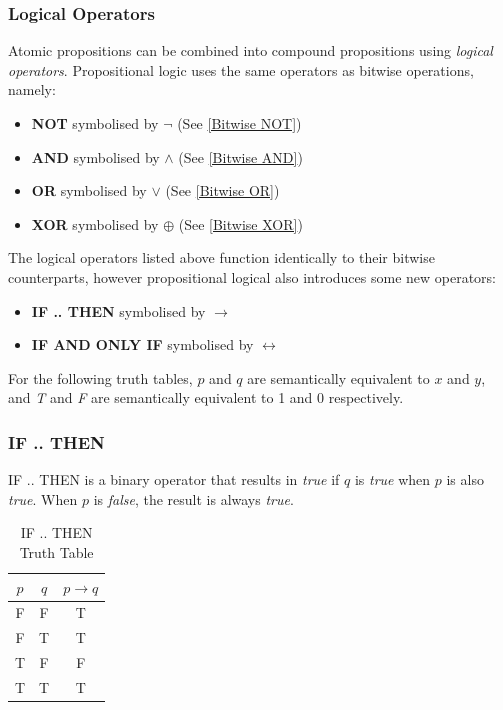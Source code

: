 \documentclass{article}
\begin{document}
\subsubsection{Logical Operators}
Atomic propositions can be combined into compound propositions using \emph{logical operators}.
Propositional logic uses the same operators as bitwise operations, namely:
\begin{itemize}
    \item \textbf{NOT} symbolised by \(\neg\) (See \ref{Bitwise NOT})
    \item \textbf{AND} symbolised by \(\wedge\) (See \ref{Bitwise AND})
    \item \textbf{OR} symbolised by \(\vee\) (See \ref{Bitwise OR})
    \item \textbf{XOR} symbolised by \(\oplus\) (See \ref{Bitwise XOR})
\end{itemize}
The logical operators listed above function identically to their bitwise counterparts,
however propositional logical also introduces some new operators:
\begin{itemize}
    \item \textbf{IF .. THEN} symbolised by \(\rightarrow\)
    \item \textbf{IF AND ONLY IF} symbolised by \(\leftrightarrow\)
\end{itemize}
\begin{tcolorbox}[title=Note]
    For the following truth tables, \(p\) and \(q\) are semantically equivalent to \(x\) and \(y\),
    and \emph{T} and \emph{F} are semantically equivalent to 1 and 0 respectively.
\end{tcolorbox}
%
\subsubsection{IF .. THEN}
IF .. THEN is a binary operator that results in \emph{true} if \(q\) is \emph{true} when \(p\) is also \emph{true}.
When \(p\) is \emph{false}, the result is always \emph{true}.
\begin{table}[h]
    \centering
    \caption{IF .. THEN Truth Table}
    \begin{tabular}{c|c|c}
        \(p\) & \(q\) & \(p \rightarrow q\) \\ \hline
        F     & F     & T              \\
        F     & T     & T              \\
        T     & F     & F              \\
        T     & T     & T              \\
    \end{tabular}
\end{table}
%
\newpage
\end{document}
